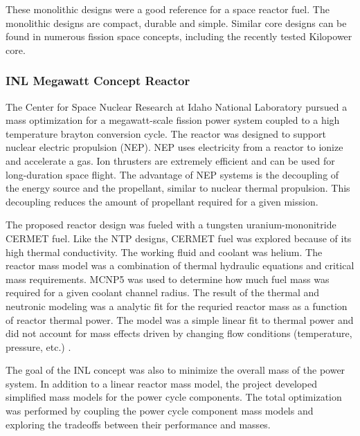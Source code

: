    These monolithic designs were a good reference for a space reactor fuel.
    The monolithic designs are compact, durable and simple. Similar core designs
    can be found in numerous fission space concepts, including the recently
    tested Kilopower core.

    \subsubsection{INL Megawatt Concept Reactor}
    The Center for Space Nuclear Research at Idaho National Laboratory pursued a
    mass optimization for a megawatt-scale fission power system coupled to a
    high temperature brayton conversion cycle. The reactor was designed to
    support nuclear electric propulsion (NEP). NEP uses electricity from a
    reactor to ionize and accelerate a gas. Ion thrusters are extremely
    efficient and can be used for long-duration space flight. The advantage of
    NEP systems is the decoupling of the energy source and the propellant,
    similar to nuclear thermal propulsion. This decoupling reduces the amount of
    propellant required for a given mission.
    
    The proposed reactor design was fueled with a tungsten uranium-mononitride
    CERMET fuel. Like the NTP designs, CERMET fuel was explored because of its
    high thermal conductivity. The working fluid and coolant was helium. The
    reactor mass model was a combination of thermal hydraulic equations and
    critical mass requirements. MCNP5 was used to determine how much fuel mass
    was required for a given coolant channel radius. The result of the thermal
    and neutronic modeling was a analytic fit for the requried reactor mass as a
    function of reactor thermal power. The model was a simple linear fit to
    thermal power and did not account for mass effects driven by changing flow
    conditions (temperature, pressure, etc.) \citep{webb_combined_2011}. 
    
    The goal of the INL concept was also to minimize the overall mass of the
    power system. In addition to a linear reactor mass model, the project
    developed simplified mass models for the power cycle components.
    The total optimization was performed by coupling the power cycle
    component mass models and exploring the tradeoffs between their performance
    and masses.

